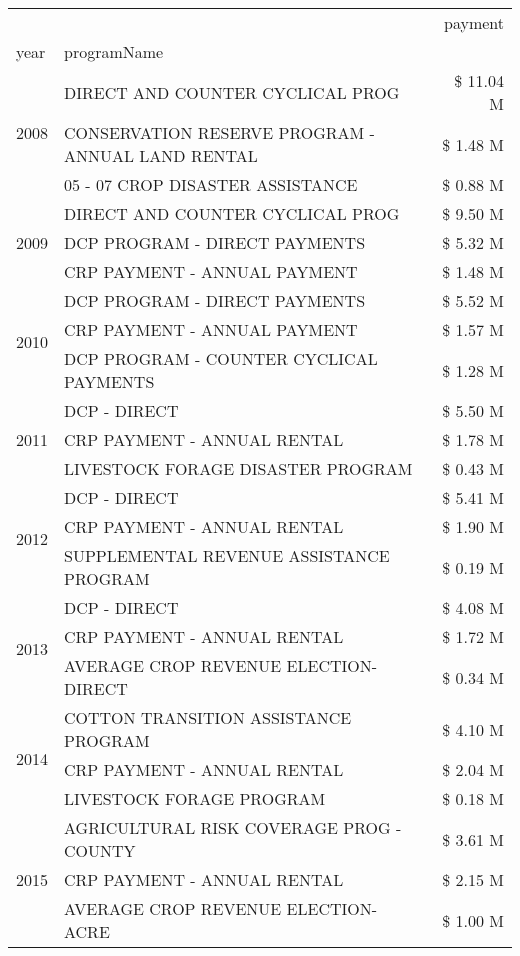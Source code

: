 \begin{tabular}{llr}
\toprule
 &  & payment \\
year & programName &  \\
\midrule
\multirow[t]{3}{*}{2008} & DIRECT AND COUNTER CYCLICAL PROG & \$ 11.04 M \\
 & CONSERVATION RESERVE PROGRAM - ANNUAL LAND RENTAL & \$ 1.48 M \\
 & 05 - 07 CROP DISASTER ASSISTANCE & \$ 0.88 M \\
\cline{1-3}
\multirow[t]{3}{*}{2009} & DIRECT AND COUNTER CYCLICAL PROG & \$ 9.50 M \\
 & DCP PROGRAM - DIRECT PAYMENTS & \$ 5.32 M \\
 & CRP PAYMENT - ANNUAL PAYMENT & \$ 1.48 M \\
\cline{1-3}
\multirow[t]{3}{*}{2010} & DCP PROGRAM - DIRECT PAYMENTS & \$ 5.52 M \\
 & CRP PAYMENT - ANNUAL PAYMENT & \$ 1.57 M \\
 & DCP PROGRAM - COUNTER CYCLICAL PAYMENTS & \$ 1.28 M \\
\cline{1-3}
\multirow[t]{3}{*}{2011} & DCP - DIRECT & \$ 5.50 M \\
 & CRP PAYMENT - ANNUAL RENTAL & \$ 1.78 M \\
 & LIVESTOCK FORAGE DISASTER PROGRAM & \$ 0.43 M \\
\cline{1-3}
\multirow[t]{3}{*}{2012} & DCP - DIRECT & \$ 5.41 M \\
 & CRP PAYMENT - ANNUAL RENTAL & \$ 1.90 M \\
 & SUPPLEMENTAL REVENUE ASSISTANCE PROGRAM & \$ 0.19 M \\
\cline{1-3}
\multirow[t]{3}{*}{2013} & DCP - DIRECT & \$ 4.08 M \\
 & CRP PAYMENT - ANNUAL RENTAL & \$ 1.72 M \\
 & AVERAGE CROP REVENUE ELECTION-DIRECT & \$ 0.34 M \\
\cline{1-3}
\multirow[t]{3}{*}{2014} & COTTON TRANSITION ASSISTANCE PROGRAM & \$ 4.10 M \\
 & CRP PAYMENT - ANNUAL RENTAL & \$ 2.04 M \\
 & LIVESTOCK FORAGE PROGRAM & \$ 0.18 M \\
\cline{1-3}
\multirow[t]{3}{*}{2015} & AGRICULTURAL RISK COVERAGE PROG - COUNTY & \$ 3.61 M \\
 & CRP PAYMENT - ANNUAL RENTAL & \$ 2.15 M \\
 & AVERAGE CROP REVENUE ELECTION-ACRE & \$ 1.00 M \\

\end{tabular}
